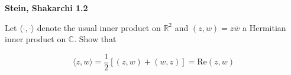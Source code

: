 \textbf{Stein, Shakarchi 1.2}

Let $\langle \cdot, \cdot \rangle$ denote the usual inner product on $\mathbb{R}^2$ and $(z, w) = z \bar{w}$ a Hermitian 
inner product on $\mathbb{C}$. Show that 

$$
\langle z, w \rangle = \frac{1}{2} \left[ (z, w) + (w, z) \right] = \text{Re}(z, w)
$$

\begin{solution}
    \ \\
\end{solution}
